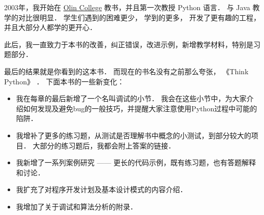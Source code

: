 
2003年，我开始在 \href{http://www.olin.edu/}{Olin College} 教书，并且第一次教授 Python 语言． 与 Java 教学的对比很明显． 学生们遇到的困难更少， 学到的更多， 开发了更有趣的工程， 并且大部分人都学的更开心．


此后，我一直致力于本书的改善，纠正错误，改进示例，新增教学材料，特别是习题部分．


最后的结果就是你看到的这本书． 而现在的书名没有之前那么夸张， 《Think Python》 ． 下面本书的一些新变化：


\begin{itemize}

\item 我在每章的最后新增了一个名叫调试的小节． 我会在这些小节中，为大家介绍如何发现及避免bug的一般技巧，并提醒大家注意使用Python过程中可能的陷阱．

\item 我增补了更多的练习题，从测试是否理解书中概念的小测试，到部分较大的项目． 大部分的练习题后，我都会附上答案的链接．

\item 我新增了一系列案例研究 —— 更长的代码示例，既有练习题，也有答题解释和讨论．

\item 我扩充了对程序开发计划及基本设计模式的内容介绍．

\item 我增加了关于调试和算法分析的附录．

\end{itemize}


